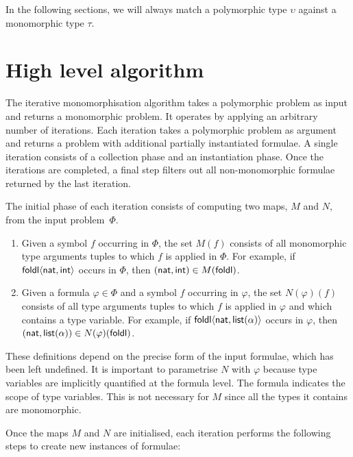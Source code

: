 \documentclass[runningheads]{llncs}
\begin{document}
In the following sections, we will always match a polymorphic type $\upsilon$ against a monomorphic type $\tau$.

\section{High level algorithm}
\label{sec:high level-algorithm}

The iterative monomorphisation algorithm takes a polymorphic problem as input and returns a monomorphic problem. It operates by applying an arbitrary number of iterations. Each iteration takes a polymorphic problem as argument and returns a problem with additional partially instantiated formulae. A single iteration consists of a collection phase and an instantiation phase. Once the iterations are completed, a final step filters out all non-monomorphic formulae returned by the last iteration.

The initial phase of each iteration consists of computing two maps, \(M\) and \(N\), from the input problem~$\Phi$.
%
\begin{enumerate}
\item[\labelitemi] Given a symbol \(f\) occurring in \(\Phi\), the set \(M(f)\) consists of all monomorphic type arguments tuples to which \(f\) is applied in \(\Phi\). For example, if \(\textsf{foldl}\langle \textsf{nat}, \textsf{int}\rangle\) occurs in \(\Phi\), then \((\textsf{nat}, \textsf{int}) \in M(\textsf{foldl}) \).

\item[\labelitemi] Given a formula \(\varphi \in \Phi\) and a symbol \(f\) occurring in \(\varphi\), the set \(N(\varphi)(f)\) consists of all type arguments tuples to which \(f\) is applied in \(\varphi\) and which contains a type variable. For example, if \(\textsf{foldl}\langle \textsf{nat}, \textsf{list}(\alpha)\rangle\) occurs in \(\varphi\), then \((\textsf{nat}, \textsf{list}(\alpha)) \in N(\varphi)(\textsf{foldl}) \).
\end{enumerate}

These definitions depend on the precise form of the input formulae, which has been left undefined. It is important to parametrise \(N\) with \(\varphi\) because type variables are implicitly quantified at the formula level. The formula indicates the scope of type variables. This is not necessary for \(M\) since all the types it contains are monomorphic.

Once the maps \(M\) and \(N\) are initialised, each iteration performs the following steps to create new instances of formulae:
\end{document}
